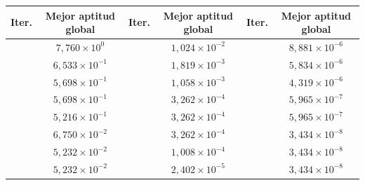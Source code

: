 \begin{table}[H]
\centering
\footnotesize
\setlength{\tabcolsep}{4pt}
\renewcommand{\arraystretch}{1.15}
\begin{tabular}{|c|c|c|c|c|c|}
\hline
\rowcolor{encabezado}\textbf{Iter.} & \textbf{Mejor aptitud global} & \textbf{Iter.} & \textbf{Mejor aptitud global} & \textbf{Iter.} & \textbf{Mejor aptitud global} \\
\hline
\cellcolor{destacado}{\bfseries\boldmath $0$} & \cellcolor{destacado}$7{,}760\times10^{0}$ & \cellcolor{iteracion}{\bfseries\boldmath $11$} & $1{,}024\times10^{-2}$ & \cellcolor{iteracion}{\bfseries\boldmath $22$} & $8{,}881\times10^{-6}$ \\
\hline
\cellcolor{iteracion}{\bfseries\boldmath $1$} & \cellcolor{cebra}$6{,}533\times10^{-1}$ & \cellcolor{iteracion}{\bfseries\boldmath $12$} & \cellcolor{cebra}$1{,}819\times10^{-3}$ & \cellcolor{iteracion}{\bfseries\boldmath $23$} & \cellcolor{cebra}$5{,}834\times10^{-6}$ \\
\hline
\cellcolor{iteracion}{\bfseries\boldmath $2$} & $5{,}698\times10^{-1}$ & \cellcolor{iteracion}{\bfseries\boldmath $13$} & $1{,}058\times10^{-3}$ & \cellcolor{iteracion}{\bfseries\boldmath $24$} & $4{,}319\times10^{-6}$ \\
\hline
\cellcolor{iteracion}{\bfseries\boldmath $3$} & \cellcolor{cebra}$5{,}698\times10^{-1}$ & \cellcolor{iteracion}{\bfseries\boldmath $14$} & \cellcolor{cebra}$3{,}262\times10^{-4}$ & \cellcolor{iteracion}{\bfseries\boldmath $25$} & \cellcolor{cebra}$5{,}965\times10^{-7}$ \\
\hline
\cellcolor{iteracion}{\bfseries\boldmath $4$} & $5{,}216\times10^{-1}$ & \cellcolor{iteracion}{\bfseries\boldmath $15$} & $3{,}262\times10^{-4}$ & \cellcolor{iteracion}{\bfseries\boldmath $26$} & $5{,}965\times10^{-7}$ \\
\hline
\cellcolor{iteracion}{\bfseries\boldmath $5$} & \cellcolor{cebra}$6{,}750\times10^{-2}$ & \cellcolor{iteracion}{\bfseries\boldmath $16$} & \cellcolor{cebra}$3{,}262\times10^{-4}$ & \cellcolor{iteracion}{\bfseries\boldmath $27$} & \cellcolor{cebra}$3{,}434\times10^{-8}$ \\
\hline
\cellcolor{iteracion}{\bfseries\boldmath $6$} & $5{,}232\times10^{-2}$ & \cellcolor{iteracion}{\bfseries\boldmath $17$} & $1{,}008\times10^{-4}$ & \cellcolor{iteracion}{\bfseries\boldmath $28$} & $3{,}434\times10^{-8}$ \\
\hline
\cellcolor{iteracion}{\bfseries\boldmath $7$} & \cellcolor{cebra}$5{,}232\times10^{-2}$ & \cellcolor{iteracion}{\bfseries\boldmath $18$} & \cellcolor{cebra}$2{,}402\times10^{-5}$ & \cellcolor{iteracion}{\bfseries\boldmath $29$} & \cellcolor{cebra}$3{,}434\times10^{-8}$ \\

\end{tabular}
\end{table}
